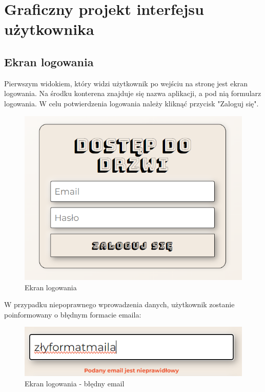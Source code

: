 \newpage
\section{Graficzny projekt interfejsu użytkownika}

\subsection{Ekran logowania}
\noindent Pierwszym widokiem, który widzi użytkownik po wejściu na stronę jest ekran logowania. 
Na środku konterena znajduje się nazwa aplikacji, a pod nią formularz logowania. 
W celu potwierdzenia logowania należy kliknąć przycisk "Zaloguj się".
\begin{figure}[h]
    \centering
    \includegraphics[scale=0.7]{photos/ekran_logowania.png}
    \caption{Ekran logowania}
    \label{fig:login}
\end{figure}

\noindent W przypadku niepoprawnego wprowadzenia danych, użytkownik zostanie poinformowany
 o błędnym formacie emaila:
\begin{figure}[h]
    \centering
    \includegraphics[scale=0.7]{photos/zlymail.png}
    \caption{Ekran logowania - błędny email}
    \label{fig:login}
\end{figure}


